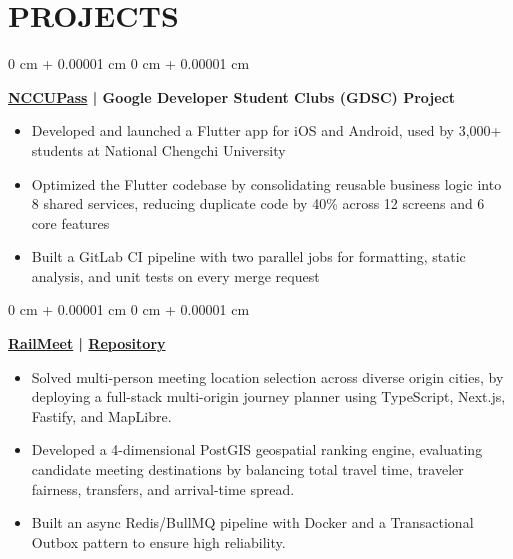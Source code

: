 \documentclass[11pt, letterpaper]{article}
\newcommand{\entrysep}{0.26cm}
\newcommand{\titlesep}{0.12cm}
\newenvironment{highlights}{
    \begin{itemize}[
        topsep=0pt,
        parsep=0pt,
        partopsep=0pt,
        itemsep=0.10cm,
        leftmargin=*,
        labelindent=10pt
    ]
}{
    \end{itemize}
} %
\newenvironment{onecolentry}{
    \begin{adjustwidth}{
        0 cm + 0.00001 cm
    }{
        0 cm + 0.00001 cm
    }
}{
    \end{adjustwidth}
} %
\begin{document}
    \section{PROJECTS}

    \begin{onecolentry}
        \textbf{\href{https://nccupass.com/}{NCCUPass} | Google Developer Student Clubs (GDSC) Project}
    
        \vspace{\titlesep}
    
        \begin{highlights}
            \item Developed and launched a Flutter app for iOS and Android, used by 3,000+ students at National Chengchi University
            \item Optimized the Flutter codebase by consolidating reusable business logic into 8 shared services, reducing duplicate code by 40\% across 12 screens and 6 core features
            \item Built a GitLab CI pipeline with two parallel jobs for formatting, static analysis, and unit tests on every merge request
        \end{highlights}
    \end{onecolentry}

    \vspace{\entrysep}

    \begin{onecolentry}
        \textbf{\href{https://railmeet.ichauw.com}{RailMeet} | \href{https://github.com/YChaoWang/RailMeet}{Repository}}

        \vspace{\titlesep}
        \begin{highlights}
            \item Solved multi-person meeting location selection across diverse origin cities, by deploying a full-stack multi-origin journey planner using TypeScript, Next.js, Fastify, and MapLibre.
            \item Developed a 4-dimensional PostGIS geospatial ranking engine, evaluating candidate meeting destinations by balancing total travel time, traveler fairness, transfers, and arrival-time spread.
            \item Built an async Redis/BullMQ pipeline with Docker and a Transactional Outbox pattern to ensure high reliability.
        \end{highlights}
    \end{onecolentry}
        
\end{document}

